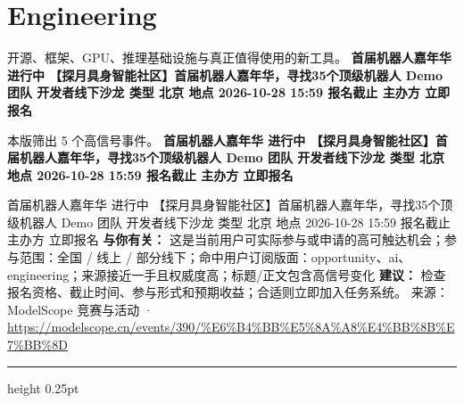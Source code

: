 \documentclass[10.5pt]{ctexart}
\begin{document}
\section*{Engineering}
{\color{ormuted} 开源、框架、GPU、推理基础设施与真正值得使用的新工具。}
\vspace{2mm}
{\LARGE\bfseries 首届机器人嘉年华 进行中 【探月具身智能社区】首届机器人嘉年华，寻找35个顶级机器人 Demo 团队 开发者线下沙龙 类型 北京 地点 2026-10-28 15:59 报名截止 主办方 立即报名}\par
\vspace{1mm}
{\color{ormuted} 本版筛出 5 个高信号事件。}
\vspace{3mm}
{\Large\bfseries 首届机器人嘉年华 进行中 【探月具身智能社区】首届机器人嘉年华，寻找35个顶级机器人 Demo 团队 开发者线下沙龙 类型 北京 地点 2026-10-28 15:59 报名截止 主办方 立即报名}\par
首届机器人嘉年华 进行中 【探月具身智能社区】首届机器人嘉年华，寻找35个顶级机器人 Demo 团队 开发者线下沙龙 类型 北京 地点 2026-10-28 15:59 报名截止 主办方 立即报名
\textbf{与你有关：} 这是当前用户可实际参与或申请的高可触达机会；参与范围：全国 / 线上 / 部分线下；命中用户订阅版面：opportunity、ai、engineering；来源接近一手且权威度高；标题/正文包含高信号变化
\textbf{建议：} 检查报名资格、截止时间、参与形式和预期收益；合适则立即加入任务系统。
{\footnotesize\color{ormuted} 来源：ModelScope 竞赛与活动 · \url{https://modelscope.cn/events/390/%E6%B4%BB%E5%8A%A8%E4%BB%8B%E7%BB%8D}}
\vspace{4mm}
\hrule height 0.25pt
\vspace{3mm}
\end{document}
